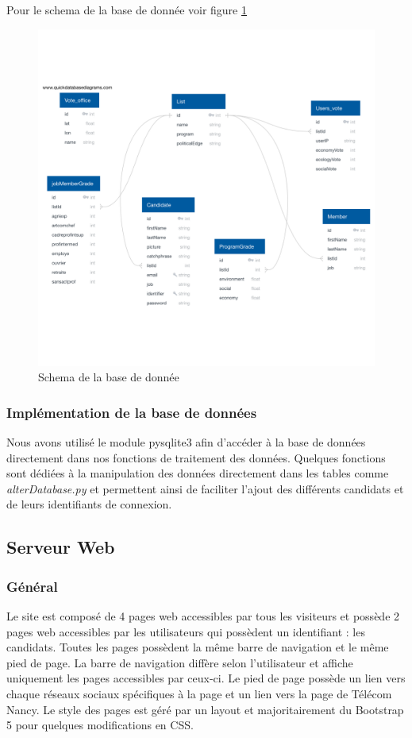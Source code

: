 Pour le schema de la base de donnée voir figure \ref{fig:schemaBD}
\begin{figure}
    \centering
    \includegraphics[scale = 0.4]{schemaBD_PPII.png}
    \caption{Schema de la base de donnée}
    \label{fig:schemaBD}
\end{figure}
\newpage

\subsubsection{Implémentation de la base de données}
\vskip 0.25cm
\noindent
Nous avons utilisé le module pysqlite3 afin d'accéder à la base de données directement dans nos fonctions de traitement des données. Quelques fonctions sont dédiées à la manipulation des données directement dans les tables comme \textit{alterDatabase.py} et permettent ainsi de faciliter l'ajout des différents candidats et de leurs identifiants de connexion.
\vskip 0.25cm
\subsection{Serveur Web}
\subsubsection{Général}
\vskip 0.25cm
\noindent
Le site est composé de 4 pages web accessibles par tous les visiteurs et possède 2 pages web accessibles par les utilisateurs qui possèdent un identifiant : les candidats.
\vskip 0.25cm
\noindent
Toutes les pages possèdent la même barre de navigation et le même pied de page. La barre de navigation diffère selon l'utilisateur et affiche uniquement les pages accessibles par ceux-ci. Le pied de page possède un lien vers chaque réseaux sociaux spécifiques à la page et un lien vers la page de Télécom Nancy. Le style des pages est géré par un layout et majoritairement du Bootstrap 5 pour quelques modifications en CSS.
\vskip 0.25cm
